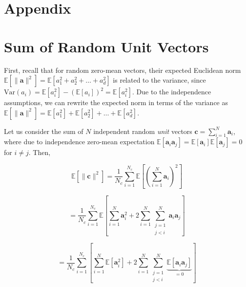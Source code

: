 \renewcommand{\thesection}{A\arabic{section}}
\renewcommand{\thesubsection}{A\arabic{section}.\arabic{subsection}}

\appendix
\clearpage
\onecolumn
\setcounter{page}{1}  %
\setcounter{section}{0}  %
\section*{Appendix}


\section{Sum of Random Unit Vectors}
\label{appendix:sum_random}

First, recall that for random zero-mean vectors, their expected Euclidean norm $\mathbb{E}[\|\mathbf{a}\|^2] = \mathbb{E}[a_1^2 + a_2^2 + \dots + a_d^2] $ is related to the variance, since $
\text{Var}(a_i) = \mathbb{E}[a_i^2] - (\mathbb{E}[a_i])^2 = \mathbb{E}[a_i^2]$. Due to the independence assumptions, we can rewrite the expected norm in terms of the variance as $\mathbb{E}[\|\mathbf{a}\|^2] = \mathbb{E}[a_1^2] + \mathbb{E}[a_2^2] + \dots + \mathbb{E}[a_d^2].$

Let us consider the sum of \(N\) independent random \textit{unit} vectors \(\mathbf{c} = \sum_{i=1}^{N} \mathbf{a}_i\), where due to independence zero-mean expectation \(\mathbb{E}[\mathbf{a}_i \mathbf{a}_j] = \mathbb{E}[\mathbf{a}_i]\mathbb{E}[\mathbf{a}_j] = 0\) for \(i \neq j\). Then,

\begin{equation}
\mathbb{E}[\|\mathbf{c}\|^2] = \frac{1}{N_c} \sum_{i=1}^{N_c} \mathbb{E} \left[ \left( \sum_{i=1}^{N}  \mathbf{a}_i \right)^2 \right]
\end{equation}

\begin{equation}
= \frac{1}{N_c} \sum_{i=1}^{N_c} \mathbb{E} \left[ \sum_{i=1}^{N} \mathbf{a}_i^2 + 2 \sum_{i=1}^{N}\sum^{N}_{\substack{j=1 \\ j < i}} \mathbf{a}_i \mathbf{a}_j \right]
\end{equation}

\begin{equation}
= \frac{1}{N_c} \sum_{i=1}^{N_c} \left[ \sum_{i=1}^{N}  \mathbb{E}[\mathbf{a}_i^2] 
+ 2 \sum^{N}_{i=1}\sum^{N}_{\substack{j=1 \\ j < i}} \underbrace{\mathbb{E}[\mathbf{a}_i \mathbf{a}_j]}_{= 0} \right]
\end{equation}


